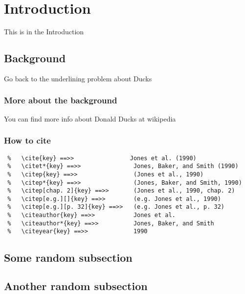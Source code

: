 \section{Introduction}
This is in the Introduction
\subsection{Background}
Go back to the underlining problem about Ducks
\subsubsection{More about the background}
You can find more info about Donald Ducks at wikipedia \citep{swasey2015silver}


\subsubsection{How to cite}

\begin{verbatim}
 %   \cite{key} ==>>                Jones et al. (1990)
 %   \citet*{key} ==>>               Jones, Baker, and Smith (1990)
 %   \citep{key} ==>>                (Jones et al., 1990)
 %   \citep*{key} ==>>               (Jones, Baker, and Smith, 1990)
 %   \citep[chap. 2]{key} ==>>       (Jones et al., 1990, chap. 2)
 %   \citep[e.g.][]{key} ==>>        (e.g. Jones et al., 1990)
 %   \citep[e.g.][p. 32]{key} ==>>   (e.g. Jones et al., p. 32)
 %   \citeauthor{key} ==>>           Jones et al.
 %   \citeauthor*{key} ==>>          Jones, Baker, and Smith
 %   \citeyear{key} ==>>             1990
\end{verbatim}

\subsection{Some random subsection}
\kant[1]

\subsection{Another random subsection}
\kant[2]